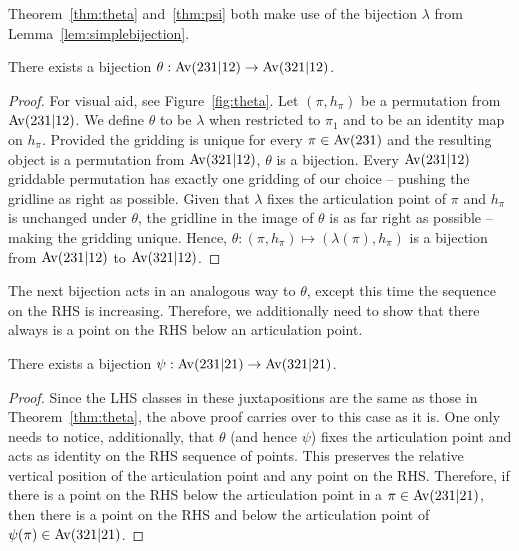 \documentclass[12pt, a4paper, twoside]{report}
\begin{document}
Theorem~\ref{thm:theta} and~\ref{thm:psi} both make use of the bijection $\lambda$ from Lemma~\ref{lem:simplebijection}. 
\begin{theorem}
\label{thm:theta}
There exists a bijection $\theta: \mathrm{Av}(231|12) \rightarrow \mathrm{Av}(321|12)$. 
\end{theorem}
\begin{proof}
For visual aid, see Figure~\ref{fig:theta}. Let $(\pi,h_\pi)$ be a permutation from $\mathrm{Av}(231|12)$. We define $\theta$ to be $\lambda$ when restricted to $\pi_1$ and to be an identity map on $h_\pi$. Provided the gridding is unique for every $\pi \in \mathrm{Av}(231)$ and the resulting object is a permutation from $\mathrm{Av}(321|12)$, $\theta$ is a bijection. Every $\mathrm{Av}(231|12)$ griddable permutation has exactly one gridding of our choice -- pushing the gridline as right as possible. Given that $\lambda$ fixes the articulation point of $\pi$ and $h_\pi$ is unchanged under $\theta$, the gridline in the image of $\theta$ is as far right as possible -- making the gridding unique. Hence, $\theta: (\pi,h_\pi) \mapsto (\lambda(\pi),h_\pi)$ is a bijection from $\mathrm{Av}(231|12)$ to $\mathrm{Av}(321|12)$. 
\end{proof}

The next bijection acts in an analogous way to $\theta$, except this time the sequence on the RHS is increasing. Therefore, we additionally need to show that there always is a point on the RHS below an articulation point.

\begin{theorem}
\label{thm:psi}
There exists a bijection $\psi: \mathrm{Av}(231|21) \rightarrow \mathrm{Av}(321|21)$. 
\end{theorem}
\begin{proof}
Since the LHS classes in these juxtapositions are the same as those in Theorem~\ref{thm:theta}, the above proof carries over to this case as it is. One only needs to notice, additionally, that $\theta$ (and hence $\psi$) fixes the articulation point and acts as identity on the RHS sequence of points. This preserves the relative vertical position of the articulation point and any point on the RHS. Therefore, if there is a point on the RHS below the articulation point in a $\pi \in \mathrm{Av}(231|21)$, then there is a point on the RHS and below the articulation point of $\psi(\pi) \in \mathrm{Av}(321|21)$. 
\end{proof}
\end{document}

